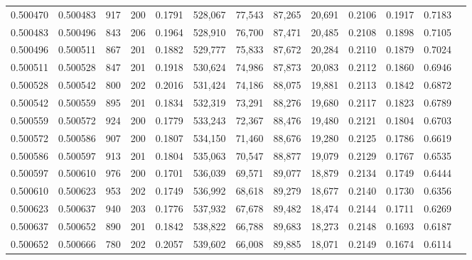 \begin{tabular}{rrrrrrrrrrrrr}
0.500470 & 0.500483 &   917 & 200 &                                     0.1791 & 528,067 &  77,543 &  87,265 &  20,691 & 0.2106 & 0.1917 & 0.7183 \\
0.500483 & 0.500496 &   843 & 206 &                                     0.1964 & 528,910 &  76,700 &  87,471 &  20,485 & 0.2108 & 0.1898 & 0.7105 \\
0.500496 & 0.500511 &   867 & 201 &                                     0.1882 & 529,777 &  75,833 &  87,672 &  20,284 & 0.2110 & 0.1879 & 0.7024 \\
0.500511 & 0.500528 &   847 & 201 &                                     0.1918 & 530,624 &  74,986 &  87,873 &  20,083 & 0.2112 & 0.1860 & 0.6946 \\
0.500528 & 0.500542 &   800 & 202 &                                     0.2016 & 531,424 &  74,186 &  88,075 &  19,881 & 0.2113 & 0.1842 & 0.6872 \\
0.500542 & 0.500559 &   895 & 201 &                                     0.1834 & 532,319 &  73,291 &  88,276 &  19,680 & 0.2117 & 0.1823 & 0.6789 \\
0.500559 & 0.500572 &   924 & 200 &                                     0.1779 & 533,243 &  72,367 &  88,476 &  19,480 & 0.2121 & 0.1804 & 0.6703 \\
0.500572 & 0.500586 &   907 & 200 &                                     0.1807 & 534,150 &  71,460 &  88,676 &  19,280 & 0.2125 & 0.1786 & 0.6619 \\
0.500586 & 0.500597 &   913 & 201 &                                     0.1804 & 535,063 &  70,547 &  88,877 &  19,079 & 0.2129 & 0.1767 & 0.6535 \\
0.500597 & 0.500610 &   976 & 200 &                                     0.1701 & 536,039 &  69,571 &  89,077 &  18,879 & 0.2134 & 0.1749 & 0.6444 \\
0.500610 & 0.500623 &   953 & 202 &                                     0.1749 & 536,992 &  68,618 &  89,279 &  18,677 & 0.2140 & 0.1730 & 0.6356 \\
0.500623 & 0.500637 &   940 & 203 &                                     0.1776 & 537,932 &  67,678 &  89,482 &  18,474 & 0.2144 & 0.1711 & 0.6269 \\
0.500637 & 0.500652 &   890 & 201 &                                     0.1842 & 538,822 &  66,788 &  89,683 &  18,273 & 0.2148 & 0.1693 & 0.6187 \\
0.500652 & 0.500666 &   780 & 202 &                                     0.2057 & 539,602 &  66,008 &  89,885 &  18,071 & 0.2149 & 0.1674 & 0.6114 \\

\end{tabular}
